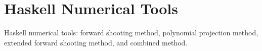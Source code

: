 \chapter{Haskell Numerical Tools}
\label{cha:haskell_numerical_tools}

\minitoc
\vspace{10mm}

Haskell numerical tools: forward shooting method, polynomial projection method, extended forward shooting method, and combined method.
